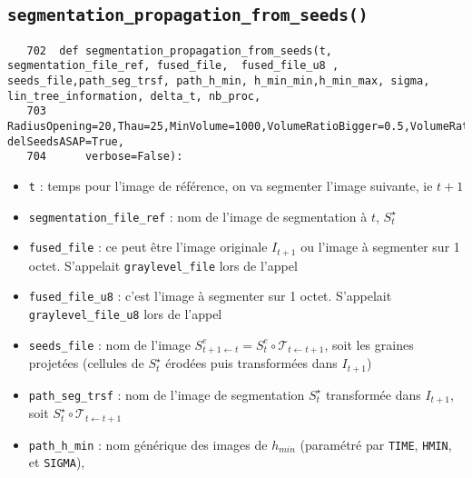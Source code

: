 \documentclass{article}
\def \mycolor {red}
\begin{document}
\subsection{\texttt{segmentation\_propagation\_from\_seeds()}}
\label{sec:segmentation:propagation:from:seeds}
\begin{verbatim}
   702	def segmentation_propagation_from_seeds(t, segmentation_file_ref, fused_file,  fused_file_u8 , seeds_file,path_seg_trsf, path_h_min, h_min_min,h_min_max, sigma, lin_tree_information, delta_t, nb_proc,
   703	    RadiusOpening=20,Thau=25,MinVolume=1000,VolumeRatioBigger=0.5,VolumeRatioSmaller=0.1,MorphosnakeIterations=10,NIterations=200,DeltaVoxels=10**3,Volum_Min_No_Seed=100, delSeedsASAP=True, 
   704	    verbose=False):
\end{verbatim} 
\color{\mycolor}
\begin{itemize}
\itemsep -1ex
\item \verb|t| : temps pour l'image de r\'ef\'erence, on va segmenter l'image suivante, ie $t+1$
\item \verb|segmentation_file_ref| : nom de l'image de segmentation \`a $t$, $S^{\star}_t$
\item \verb|fused_file| : ce peut \^etre l'image originale $I_{t+1}$ ou  l'image \`a segmenter sur 1 octet. S'appelait \verb|graylevel_file| lors de l'appel
\item \verb|fused_file_u8| : c'est l'image \`a segmenter sur 1 octet. S'appelait \verb|graylevel_file_u8| lors de l'appel
\item \verb|seeds_file| : nom de l'image $S^e_{t+1 \leftarrow t} = S^e_t \circ \mathcal{T}_{t \leftarrow t+1}$, soit les graines projet\'ees (cellules de $S^{\star}_t$ \'erod\'ees puis transform\'ees dans $I_{t+1}$)
\item \verb|path_seg_trsf| : nom de l'image de segmentation $S^{\star}_t$ transform\'ee dans $I_{t+1}$, soit
$S^{\star}_t \circ \mathcal{T}_{t \leftarrow t+1}$
\item \verb|path_h_min| : nom g\'en\'erique des images de $h_{min}$ (param\'etr\'e par \verb|TIME|, \verb|HMIN|, et \verb|SIGMA|),
\end{itemize}
\color{black}
\end{document}

